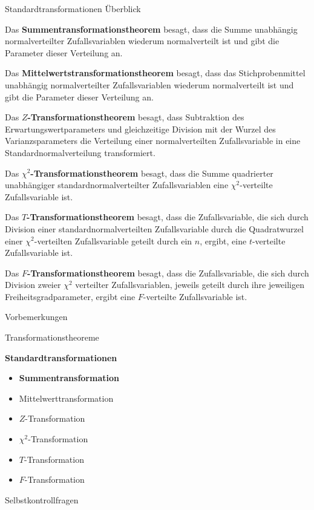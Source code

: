 \documentclass[
  8pt,
  ignorenonframetext,
]{beamer}
\providecommand{\tightlist}{%
  \setlength{\itemsep}{0pt}\setlength{\parskip}{0pt}}
\begin{document}
\begin{frame}{Standardtransformationen}
\protect\hypertarget{standardtransformationen}{}
Überblick \vspace{1mm}

\justifying
\footnotesize

Das \textbf{Summentransformationstheorem} besagt, dass die Summe
unabhängig normalverteilter Zufallsvariablen wiederum normalverteilt ist
und gibt die Parameter dieser Verteilung an.

Das \textbf{Mittelwertstransformationstheorem} besagt, dass das
Stichprobenmittel unabhängig normalverteilter Zufallsvariablen wiederum
normalverteilt ist und gibt die Parameter dieser Verteilung an.

Das \textbf{\(Z\)-Transformationstheorem} besagt, dass Subtraktion des
Erwartungswertparameters und gleichzeitige Division mit der Wurzel des
Varianzsparameters die Verteilung einer normalverteilten Zufallsvariable
in eine Standardnormalverteilung transformiert.

Das \textbf{\(\chi^2\)-Transformationstheorem} besagt, dass die Summe
quadrierter unabhängiger standardnormalverteilter Zufallsvariablen eine
\(\chi^2\)-verteilte Zufallsvariable ist.

Das \textbf{\(T\)-Transformationstheorem} besagt, dass die
Zufallsvariable, die sich durch Division einer standardnormalverteilten
Zufallsvariable durch die Quadratwurzel einer \(\chi^2\)-verteilten
Zufallsvariable geteilt durch ein \(n\), ergibt, eine \(t\)-verteilte
Zufallsvariable ist.

Das \textbf{\(F\)-Transformationstheorem} besagt, dass die
Zufallsvariable, die sich durch Division zweier \(\chi^2\) verteilter
Zufallsvariablen, jeweils geteilt durch ihre jeweiligen
Freiheitsgradparameter, ergibt eine \(F\)-verteilte Zufallsvariable ist.
\end{frame}

\begin{frame}{}
\protect\hypertarget{section-6}{}
\large

Vorbemerkungen

Transformationstheoreme

\textbf{Standardtransformationen}

\normalsize

\begin{itemize}
\tightlist
\item
  \textbf{Summentransformation}
\item
  Mittelwerttransformation
\item
  \(Z\)-Transformation
\item
  \(\chi^2\)-Transformation
\item
  \(T\)-Transformation
\item
  \(F\)-Transformation
\end{itemize}

\large

Selbstkontrollfragen
\end{frame}
\end{document}
